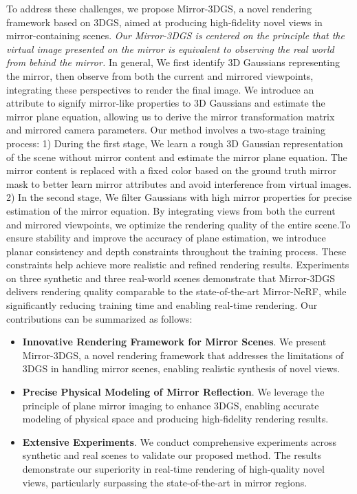 \documentclass[conference]{IEEEtran}
\begin{document}
To address these challenges, we propose Mirror-3DGS, a novel rendering framework based on 3DGS, aimed at producing high-fidelity novel views in mirror-containing scenes. \textit{Our Mirror-3DGS is centered on the principle that the virtual image presented on the mirror is equivalent to observing the real world from behind the mirror.} In general, We first identify 3D Gaussians representing the mirror, then observe from both the current and mirrored viewpoints, integrating these perspectives to render the final image. We introduce an attribute to signify mirror-like properties to 3D Gaussians and estimate the mirror plane equation, allowing us to derive the mirror transformation matrix and mirrored camera parameters. Our method involves a two-stage training process: 1) During the first stage, We learn a rough 3D Gaussian representation of the scene without mirror content and estimate the mirror plane equation. The mirror content is replaced with a fixed color based on the ground truth mirror mask to better learn mirror attributes and avoid interference from virtual images.
2) In the second stage, We filter Gaussians with high mirror properties for precise estimation of the mirror equation. By integrating views from both the current and mirrored viewpoints, we optimize the rendering quality of the entire scene.To ensure stability and improve the accuracy of plane estimation, we introduce planar consistency and depth constraints throughout the training process. These constraints help achieve more realistic and refined rendering results. Experiments on three synthetic and three real-world scenes demonstrate that Mirror-3DGS delivers rendering quality comparable to the state-of-the-art Mirror-NeRF, while significantly reducing training time and enabling real-time rendering. Our contributions can be summarized as follows:
\begin{itemize}
    \item \textbf{Innovative Rendering Framework for Mirror Scenes}. We present Mirror-3DGS, a novel rendering framework that addresses the limitations of 3DGS in handling mirror scenes, enabling realistic synthesis of novel views.
    
    \item \textbf{Precise Physical Modeling of Mirror Reflection}. We leverage the principle of plane mirror imaging to enhance 3DGS, enabling accurate modeling of physical space and producing high-fidelity rendering results.

    \item \textbf{Extensive Experiments}. We conduct comprehensive experiments across synthetic and real scenes to validate our proposed method. The results demonstrate our superiority in real-time rendering of high-quality novel views, particularly surpassing the state-of-the-art in mirror regions.
\end{itemize}
\end{document}
